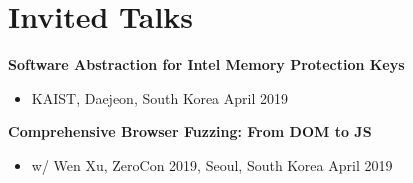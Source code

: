 \section*{Invited Talks}
\begin{description}

    \item \textbf{Software Abstraction for Intel Memory Protection Keys}
      \begin{itemize}
         \item KAIST, Daejeon, South Korea \dotfill April 2019
      \end{itemize}

    \item \textbf{Comprehensive Browser Fuzzing: From DOM to JS}
      \begin{itemize}
          \item w/ Wen Xu, ZeroCon 2019, Seoul, South Korea \dotfill April 2019
      \end{itemize}
      
\end{description}
